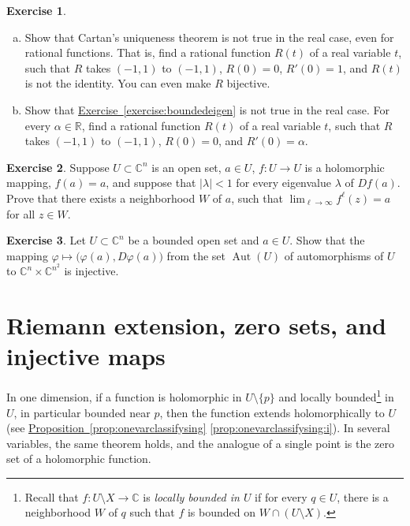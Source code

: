 \documentclass[12pt,openany]{book}
\newcommand{\Aut}{\operatorname{Aut}}
\newcommand{\sabs}[1]{\lvert {#1} \rvert}
\newcommand{\C}{{\mathbb{C}}}
\newcommand{\R}{{\mathbb{R}}}
\theoremstyle{plain}
\theoremstyle{remark}
\theoremstyle{definition}
\newenvironment{exbox}{%
    \def\FrameCommand{\vrule width 1pt \relax\hspace{10pt}}%
    \MakeFramed{\advance\hsize-\width\FrameRestore}%
}{%
    \endMakeFramed
}
\newenvironment{exparts}{%
    \leavevmode\begin{enumerate}[a),noitemsep,topsep=0pt,parsep=0pt,partopsep=0pt]
}{%
    \end{enumerate}
}
\theoremstyle{exercise}
\newtheorem{exercise}{Exercise}[section]
\theoremstyle{example}
\newcommand{\exerciseref}[1]{\hyperref[#1]{Exercise~\ref*{#1}}}
\newcommand{\propref}[1]{\hyperref[#1]{Proposition~\ref*{#1}}}
\begin{document}
\begin{exbox}
\begin{exercise}
\begin{exparts}
\item
Show that Cartan's uniqueness theorem is not true in the real case,
even for rational
functions.  That is, find a rational function $R(t)$ of
a real variable $t$, such that $R$ takes $(-1,1)$ to
$(-1,1)$, $R(0)=0$, $R'(0) = 1$, and $R(t)$ is not the identity.  You can even make
$R$ bijective.
\item
Show that \exerciseref{exercise:boundedeigen} is not true in the real
case.
For every $\alpha \in \R$, find a rational function $R(t)$ of
a real variable $t$, such that $R$ takes $(-1,1)$ to $(-1,1)$,
$R(0)=0$, and
$R'(0) = \alpha$.
\end{exparts}
\end{exercise}

\begin{exercise}
Suppose $U \subset \C^n$ is an open set, $a \in U$,
$f \colon U \to U$ is a holomorphic mapping,
$f(a) = a$, and suppose that $\sabs{\lambda} < 1$
for every eigenvalue $\lambda$ of
$D f(a)$.  Prove that there exists a neighborhood $W$ of $a$, such that
$\lim_{\ell \to \infty} f^{\ell}(z) = a$ for all $z \in W$.
\end{exercise}

\begin{exercise}
Let $U \subset \C^n$ be a bounded open set and $a \in U$.
Show that the mapping $\varphi \mapsto \bigl(\varphi(a),D\varphi(a)\bigr)$
from the set $\Aut(U)$ of automorphisms of $U$ to $\C^n \times \C^{n^2}$
is injective.
\end{exercise}
\end{exbox}


\section{Riemann extension, zero sets, and injective maps}
\label{sec:riemannextzerosetsinjmaps}

In one dimension, if a function is holomorphic in
$U \setminus \{ p \}$ and
locally bounded\footnote{%
Recall that $f \colon U \setminus X \to \C$ is \emph{locally bounded in $U$}
if for every $q \in U$, there is a neighborhood $W$ of
$q$ such that $f$ is bounded on $W \cap (U \setminus X)$.}
in $U$, in particular bounded near
$p$, then the function extends holomorphically to $U$ (see
\propref{prop:onevarclassifysing} \ref{prop:onevarclassifysing:i}).
In several variables,
the same theorem holds, and the analogue of a single point
is the zero set of a holomorphic function.
\end{document}
